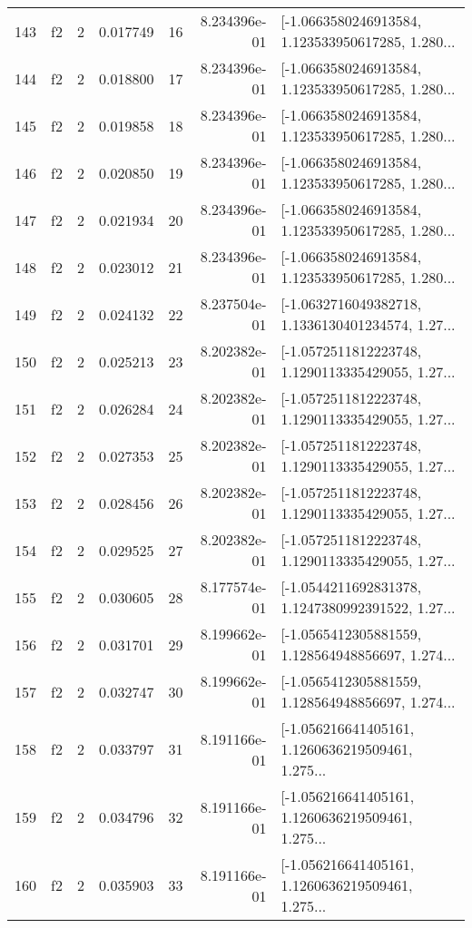 \begin{tabular}{lllrlrl}
143 &  f2 &   2 &  0.017749 &   16 &  8.234396e-01 &  [-1.0663580246913584, 1.123533950617285, 1.280... \\
144 &  f2 &   2 &  0.018800 &   17 &  8.234396e-01 &  [-1.0663580246913584, 1.123533950617285, 1.280... \\
145 &  f2 &   2 &  0.019858 &   18 &  8.234396e-01 &  [-1.0663580246913584, 1.123533950617285, 1.280... \\
146 &  f2 &   2 &  0.020850 &   19 &  8.234396e-01 &  [-1.0663580246913584, 1.123533950617285, 1.280... \\
147 &  f2 &   2 &  0.021934 &   20 &  8.234396e-01 &  [-1.0663580246913584, 1.123533950617285, 1.280... \\
148 &  f2 &   2 &  0.023012 &   21 &  8.234396e-01 &  [-1.0663580246913584, 1.123533950617285, 1.280... \\
149 &  f2 &   2 &  0.024132 &   22 &  8.237504e-01 &  [-1.0632716049382718, 1.1336130401234574, 1.27... \\
150 &  f2 &   2 &  0.025213 &   23 &  8.202382e-01 &  [-1.0572511812223748, 1.1290113335429055, 1.27... \\
151 &  f2 &   2 &  0.026284 &   24 &  8.202382e-01 &  [-1.0572511812223748, 1.1290113335429055, 1.27... \\
152 &  f2 &   2 &  0.027353 &   25 &  8.202382e-01 &  [-1.0572511812223748, 1.1290113335429055, 1.27... \\
153 &  f2 &   2 &  0.028456 &   26 &  8.202382e-01 &  [-1.0572511812223748, 1.1290113335429055, 1.27... \\
154 &  f2 &   2 &  0.029525 &   27 &  8.202382e-01 &  [-1.0572511812223748, 1.1290113335429055, 1.27... \\
155 &  f2 &   2 &  0.030605 &   28 &  8.177574e-01 &  [-1.0544211692831378, 1.1247380992391522, 1.27... \\
156 &  f2 &   2 &  0.031701 &   29 &  8.199662e-01 &  [-1.0565412305881559, 1.128564948856697, 1.274... \\
157 &  f2 &   2 &  0.032747 &   30 &  8.199662e-01 &  [-1.0565412305881559, 1.128564948856697, 1.274... \\
158 &  f2 &   2 &  0.033797 &   31 &  8.191166e-01 &  [-1.056216641405161, 1.1260636219509461, 1.275... \\
159 &  f2 &   2 &  0.034796 &   32 &  8.191166e-01 &  [-1.056216641405161, 1.1260636219509461, 1.275... \\
160 &  f2 &   2 &  0.035903 &   33 &  8.191166e-01 &  [-1.056216641405161, 1.1260636219509461, 1.275... \\

\end{tabular}
